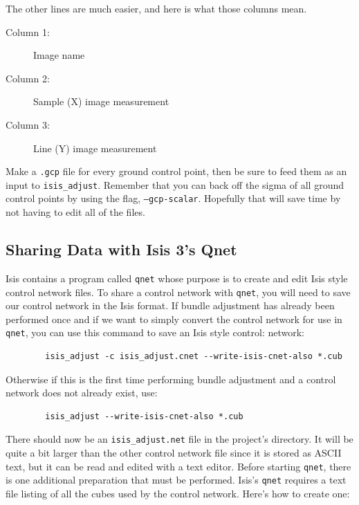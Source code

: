 The other lines are much easier, and here is what those columns mean.

\begin{myindentpar}{2cm}
\begin{description}
  \item[Column 1:] Image name
  \item[Column 2:] Sample (X) image measurement
  \item[Column 3:] Line (Y) image measurement
\end{description}
\end{myindentpar}

Make a {\tt .gcp} file for every ground control point, then be sure to
feed them as an input to {\tt isis\_adjust}. Remember that you can
back off the sigma of all ground control points by using the flag,
{\tt --gcp-scalar}. Hopefully that will save time by not having to
edit all of the files.

\subsection{Sharing Data with Isis 3's Qnet}

Isis contains a program called \texttt{qnet} whose purpose is to
create and edit Isis style control network files. To share a control
network with \texttt{qnet}, you will need to save our control network
in the Isis format. If bundle adjustment has already been performed
once and if we want to simply convert the control network for use in
\texttt{qnet}, you can use this command to save an Isis style control:
network:

\begin{verbatim}
        isis_adjust -c isis_adjust.cnet --write-isis-cnet-also *.cub
\end{verbatim}

Otherwise if this is the first time performing bundle adjustment and a
control network does not already exist, use:

\begin{verbatim}
        isis_adjust --write-isis-cnet-also *.cub
\end{verbatim}

There should now be an \verb=isis_adjust.net= file in the project's
directory. It will be quite a bit larger than the other control
network file since it is stored as ASCII text, but it can be read and
edited with a text editor. Before starting \texttt{qnet}, there is one
additional preparation that must be performed. Isis's \texttt{qnet} requires
a text file listing of all the cubes used by the control
network. Here's how to create one:

